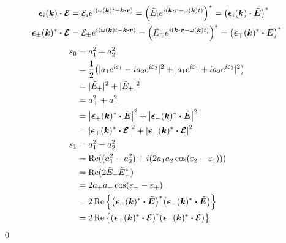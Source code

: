 \documentclass[uplatex,dvipdfmx,a4paper,11pt]{jlreq}
\makeatletter
\newcommand{\rr}{\bm{r}}
\newcommand{\kk}{\bm{k}}
\theoremstyle{definition}
\renewenvironment{proof}[1][\proofname]{\par
  \normalfont
  \topsep6\p@\@plus6\p@ \trivlist
  \item[\hskip\labelsep{\bfseries #1}\@addpunct{\bfseries}]\ignorespaces\quad\par
}{%
  \qed\endtrivlist\@endpefalse
}
\renewcommand\proofname{証明}
\makeatother
\begin{document}
\begin{proof}
  \begin{align}
    \ee_i(\kk)\vdot\EC
     & = \Ec_ie^{i(\omega(\kk)t - \kk\vdot\rr)} = \qty(\Et_i e^{i(\kk\vdot\rr - \omega(\kk)t)})^* = \qty(\ee_i(\kk)\vdot\ET)^* \label{EC ET converter 12}          \\
    \ee_\pm(\kk)^*\vdot\EC
     & = \Ec_\pm e^{i(\omega(\kk)t - \kk\vdot\rr)} = \qty(\Et_\mp e^{i(\kk\vdot\rr - \omega(\kk)t)})^* = \qty(\ee_\mp(\kk)^*\vdot\ET)^* \label{EC ET converter +-}
  \end{align}
  \begin{align}
    s_0 & = a_1^2 + a_2^2                                                                                                              \\
        & = \frac{1}{2}\qty(|a_1e^{i\varepsilon_1} - i a_2e^{i\varepsilon_2}|^2 + |a_1e^{i\varepsilon_1} + i a_2e^{i\varepsilon_2}|^2) \\
        & = |\tilde{E}_+|^2 + |\tilde{E}_+|^2                                                                                          \\
        & = a_+^2 + a_-^2                                                                                                              \\
        & = \qty|\ee_+(\kk)^*\vdot\ET|^2 + \qty|\ee_-(\kk)^*\vdot\ET|^2                                                                \\
        & = \qty|\ee_+(\kk)^*\vdot\EC|^2 + \qty|\ee_-(\kk)^*\vdot\EC|^2                                                                \\
    s_1 & = a_1^2 - a_2^2                                                                                                              \\
        & = \Re((a_1^2 - a_2^2) + i(2a_1a_2\cos(\varepsilon_2 - \varepsilon_1)))                                                       \\
        & = \Re(2\tilde{E}_-\tilde{E}_+^*)                                                                                             \\
        & = 2a_+a_-\cos(\varepsilon_- - \varepsilon_+)                                                                                 \\
        & = 2\Re\qty{\qty(\ee_+(\kk)^*\vdot\ET)^*\qty(\ee_-(\kk)^*\vdot\ET)}                                                           \\
        & = 2\Re\qty{\qty(\ee_+(\kk)^*\vdot\EC)^*\qty(\ee_-(\kk)^*\vdot\EC)}                                                           \\

\end{align}
\end{proof}
\end{document}
